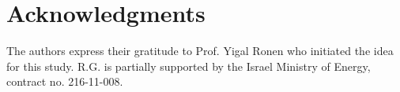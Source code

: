 %
\section*{Acknowledgments}
\label{sec:acknow}
The authors express their gratitude to Prof. Yigal Ronen who initiated the idea for this study. R.G. is partially supported by the Israel Ministry of Energy, contract no. 216-11-008. 


	

%







